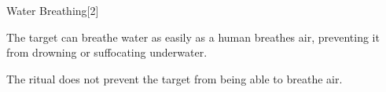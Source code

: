\begin{spellsection}{Water Breathing}[2]
    \begin{spellheader}
    \end{spellheader}
    \begin{spellcontent}
        \begin{spelltargetinginfo}
        \end{spelltargetinginfo}
        \begin{spelleffects}
            \spelleffect The target can breathe water as easily as a human breathes air, preventing it from drowning or suffocating underwater.
            \spelldur \durext \dismissable
        \end{spelleffects}
    \end{spellcontent}
    \begin{spellfooter}
        \spellnotes The ritual does not prevent the target from being able to breathe air.
    \end{spellfooter}
    \begin{spellaugments}
    \end{spellaugments}
\end{spellsection}

